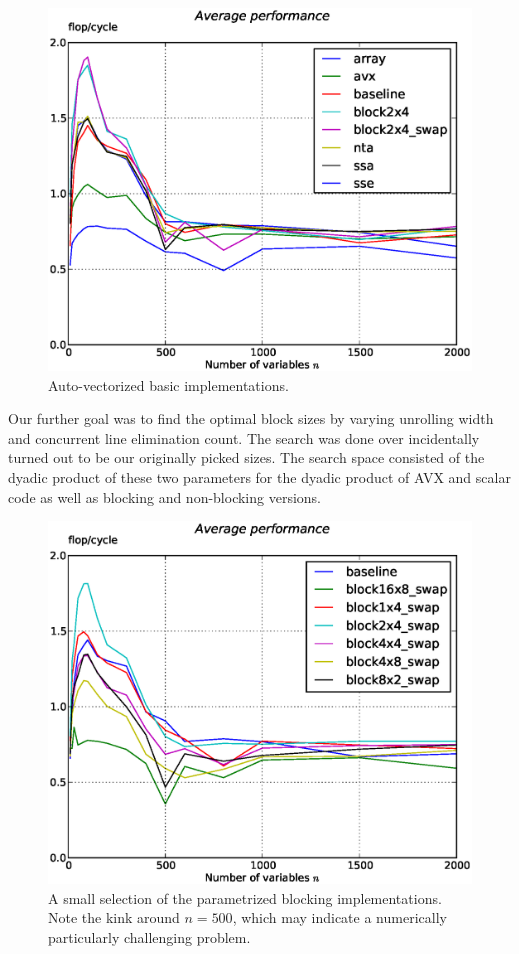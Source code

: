 \documentclass[letterpaper]{article}
\begin{document}
\begin{figure}\centering
  \includegraphics[scale=0.4]{img/results_basic_autovec.eps}
  \caption{Auto-vectorized basic implementations.\label{res_basic_autovec}}
\end{figure}


Our further goal was to find the optimal block sizes by varying unrolling width and concurrent line elimination count. The search was done over incidentally turned out to be our originally picked sizes.
The search space consisted of the dyadic product of these two parameters for the dyadic product of AVX and scalar code as well as blocking and non-blocking versions.

\begin{figure}\centering
  \includegraphics[scale=0.4]{img/results_find_blocks.eps}
  \caption{A small selection of the parametrized blocking implementations. Note the kink around $n=500$, which may indicate a numerically particularly challenging problem.\label{res_findblock}}
\end{figure}
\end{document}
